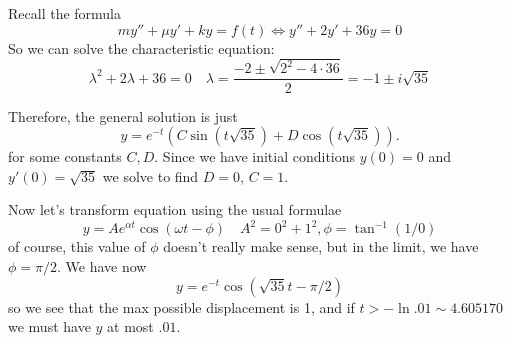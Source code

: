 \documentclass[14pt]{article}
\begin{document}
Recall the formula
\[ m y'' + \mu y' + k y = f(t) \Leftrightarrow y'' + 2 y' + 36 y =0\]
So we can solve the characteristic equation:
\[\lambda^2 + 2 \lambda + 36 = 0 \quad \lambda = \frac{-2 \pm \sqrt{2^2 - 4 \cdot 36}}{2} = -1 \pm  i \sqrt{35}\]

Therefore, the general solution is just
\[y = e^{-t} ( C \sin{(t\sqrt{35})} + D \cos{(t\sqrt{35})} ).\]
for some constants $C,D$. Since we have initial conditions $y(0) = 0$ and $y'(0) = \sqrt{35}$ we solve to find $D = 0$, $C = 1$. 

Now let's transform equation using the usual formulae
\[y = A e^{\alpha t}  \cos{(\omega t - \phi)} \quad A^2 = 0^2 + 1^2 , 
\phi = \tan^{-1}(1/0)\]
of course, this value of $\phi$ doesn't really make sense, but in the limit, we have $\phi = \pi/ 2$. We have now
\[ y =  e^{ -t} \cos{(\sqrt{35} t - \pi /2)}\]
so we see that the max possible displacement is 1, and if $t > - \ln .01 \sim 4.605170$ we must have $y$ at most $.01$.
\end{document}
